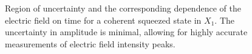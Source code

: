 \begin{figure}
\centering



\caption{Region of uncertainty and the corresponding dependence of the electric field on time for a coherent squeezed state in $X_1$. The uncertainty in amplitude is minimal, allowing for highly accurate measurements of electric field intensity peaks.} 
\label{figPart3Squeezed_2}
\end{figure}